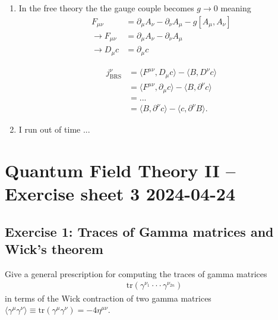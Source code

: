 \documentclass[10pt,a4paper]{article}
\theoremstyle{definition}
\begin{document}
\begin{enumerate}
\item In the free theory the the gauge couple becomes $g\rightarrow0$  meaning
\begin{align}
F_{\mu\nu}
&=\partial_\mu A_\nu-\partial_\nu A_\mu-g[A_\mu,A_\nu]\\
\rightarrow F_{\mu\nu}&=\partial_\mu A_\nu-\partial_\nu A_\mu\\
\rightarrow D_\mu c&=\partial_\mu c
\end{align}

\begin{align}
j^\nu_\text{BRS}
&=\langle F^{\mu\nu}, D_\mu c\rangle-\langle B, D^\nu c\rangle\\
&=\langle F^{\mu\nu}, \partial_\mu c\rangle-\langle B, \partial^\nu c\rangle\\
&=...\\
&=\langle B,\partial^\nu c\rangle-\langle c,\partial^\nu B\rangle.
\end{align}

\item I run out of time ...


\end{enumerate}




\newpage
\section{Quantum Field Theory II – Exercise sheet 3 2024-04-24}
\subsection{Exercise 1: Traces of Gamma matrices and Wick’s theorem}
{\color{blue}
Give a general prescription for computing the traces of gamma matrices
\begin{align}
\text{tr}(\gamma^{\nu_1}···\gamma^{\nu_{2n}}) \tag{1}
\end{align}
in terms of the Wick contraction of two gamma matrices $\langle\gamma^\mu\gamma^\nu\rangle\equiv\text{tr}(\gamma^\mu\gamma^\nu)=-4\eta^{\mu\nu}$.}
\end{document}

